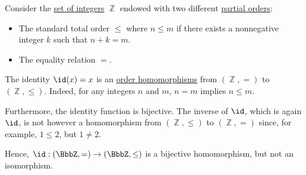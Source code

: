 \begin{example}\label{ex:bijective_order_homomorphism_not_isomorphism}
  Consider the \hyperref[def:integers]{set of integers} \( \BbbZ \) endowed with two different \hyperref[def:partially_ordered_set]{partial orders}:
  \begin{itemize}
    \item The standard total order \( \leq \) where \( n \leq m \) if there exists a nonnegative integer \( k \) such that \( n + k = m \).
    \item The equality relation \( = \).
  \end{itemize}

  The identity \( \id(x) = x \) is an \hyperref[def:order_function]{order homomorphisms} from \( (\BbbZ, =) \) to \( (\BbbZ, \leq) \). Indeed, for any integers \( n \) and \( m \), \( n = m \) implies \( n \leq m \).

  Furthermore, the identity function is bijective. The inverse of \( \id \), which is again \( \id \), is not however a homomorphism from \( (\BbbZ, \leq) \) to \( (\BbbZ, =) \) since, for example, \( 1 \leq 2 \), but \( 1 \neq 2 \).

  Hence, \( \id: (\BbbZ, =) \to (\BbbZ, \leq) \) is a bijective homomorphism, but not an isomorphism.
\end{example}

